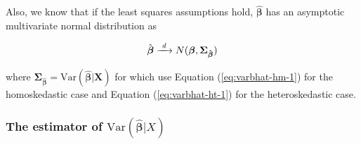 \documentclass[a4paper,11pt]{article}
\newcommand{\var}{\mathrm{Var}}
\newcommand{\rarrowd}[1]{\xrightarrow{\text{ \textit #1 }}}
\begin{document}
Also, we know that if the least squares assumptions hold,
\(\hat{\boldsymbol{\beta}}\) has an asymptotic multivariate normal
distribution as

\begin{equation}
\label{eq:normal-bhat-m}
\hat{\boldsymbol{\beta}} \rarrowd{d} N(\boldsymbol{\beta}, \mathbf{\Sigma_{\hat{\boldsymbol{\beta}}}})
\end{equation}

where \(\mathbf{\Sigma_{\hat{\boldsymbol{\beta}}}} =
\var(\hat{\boldsymbol{\beta}} | \mathbf{X})\) for which use
Equation (\ref{eq:varbhat-hm-1}) for the homoskedastic case and Equation
(\ref{eq:varbhat-ht-1}) for the heteroskedastic case.


\subsubsection*{The estimator of \(\var(\hat{\boldsymbol{\beta}}|X)\)}
\label{sec:org63354f1}
\end{document}
